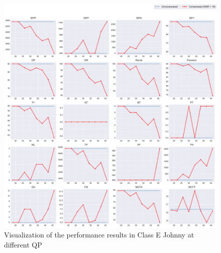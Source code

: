 \begin{figure}[!htbp]
  \centering
  \includegraphics[width=1.0\linewidth]{img/Johnny_0_multiplots_qp.pdf}
  \caption[Visualization of the performance results in Class E Johnny at different QP]
  {
  Visualization of the performance results in Class E Johnny at different QP
  }
  \label{fig:Johnny_0_multiplots_qp}
\end{figure}